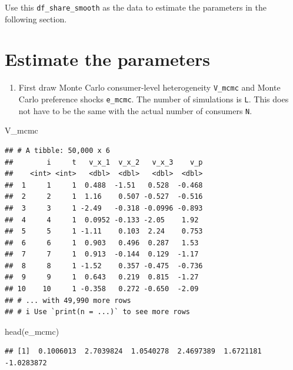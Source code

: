 \documentclass[
]{book}
\newenvironment{Shaded}{\begin{snugshade}}{\end{snugshade}}
\newcommand{\FunctionTok}[1]{\textcolor[rgb]{0.00,0.00,0.00}{#1}}
\newcommand{\NormalTok}[1]{#1}
\providecommand{\tightlist}{%
  \setlength{\itemsep}{0pt}\setlength{\parskip}{0pt}}
\begin{document}
Use this \texttt{df\_share\_smooth} as the data to estimate the parameters in the following section.

\hypertarget{estimate-the-parameters-2}{%
\section{Estimate the parameters}\label{estimate-the-parameters-2}}

\begin{enumerate}
\def\labelenumi{\arabic{enumi}.}
\tightlist
\item
  First draw Monte Carlo consumer-level heterogeneity \texttt{V\_mcmc} and Monte Carlo preference shocks \texttt{e\_mcmc}. The number of simulations is \texttt{L}. This does not have to be the same with the actual number of consumers \texttt{N}.
\end{enumerate}

\begin{Shaded}
\begin{Highlighting}[]
\NormalTok{V\_mcmc}
\end{Highlighting}
\end{Shaded}

\begin{verbatim}
## # A tibble: 50,000 x 6
##        i     t   v_x_1  v_x_2   v_x_3    v_p
##    <int> <int>   <dbl>  <dbl>   <dbl>  <dbl>
##  1     1     1  0.488  -1.51   0.528  -0.468
##  2     2     1  1.16    0.507 -0.527  -0.516
##  3     3     1 -2.49   -0.318 -0.0996 -0.893
##  4     4     1  0.0952 -0.133 -2.05    1.92 
##  5     5     1 -1.11    0.103  2.24    0.753
##  6     6     1  0.903   0.496  0.287   1.53 
##  7     7     1  0.913  -0.144  0.129  -1.17 
##  8     8     1 -1.52    0.357 -0.475  -0.736
##  9     9     1  0.643   0.219  0.815  -1.27 
## 10    10     1 -0.358   0.272 -0.650  -2.09 
## # ... with 49,990 more rows
## # i Use `print(n = ...)` to see more rows
\end{verbatim}

\begin{Shaded}
\begin{Highlighting}[]
\FunctionTok{head}\NormalTok{(e\_mcmc)}
\end{Highlighting}
\end{Shaded}

\begin{verbatim}
## [1]  0.1006013  2.7039824  1.0540278  2.4697389  1.6721181 -1.0283872
\end{verbatim}
\end{document}
